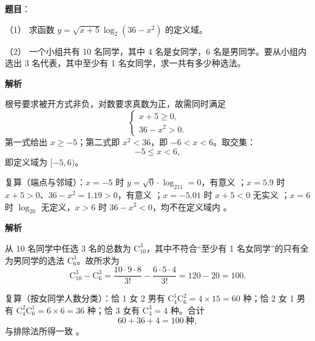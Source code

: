 \begin{answer}

\textbf{题目}：

（1） 求函数 $y=\sqrt{x+5}\log_2(36-x^2)$ 的定义域。

（2） 一个小组共有 10 名同学，其中 4 名是女同学，6 名是男同学。要从小组内选出 3 名代表，其中至少有 1 名女同学，求一共有多少种选法。

\textbf{解析}


根号要求被开方式非负，对数要求真数为正，故需同时满足
\nopagebreak[4]
\[
\begin{cases}
x+5\ge0,\\[2pt]
36-x^2>0.
\end{cases}
\]
第一式给出 $x\ge-5$；第二式即 $x^2<36$，即 $-6<x<6$。取交集：
\nopagebreak[4]
\[
-5\le x<6,
\]
即定义域为 $[-5,6)$。

复算（端点与邻域）：$x=-5$ 时 $y=\sqrt0\cdot\log_211=0$，有意义 ；$x=5.9$ 时 $x+5>0$、$36-x^2=1.19>0$，有意义 ；$x=-5.01$ 时 $x+5<0$ 无实义 ；$x=6$ 时 $\log_20$ 无定义，$x>6$ 时 $36-x^2<0$，均不在定义域内 。


\textbf{解析}

从 10 名同学中任选 3 名的总数为 $\mathrm C_{10}^3$，其中不符合“至少有 1 名女同学”的只有全为男同学的选法 $\mathrm C_6^3$。故所求为
\nopagebreak[4]
\[
\mathrm C_{10}^3-\mathrm C_6^3=\frac{10\cdot9\cdot8}{3!}-\frac{6\cdot5\cdot4}{3!}=120-20=100.
\]

复算（按女同学人数分类）：恰 1 女 2 男有 $\mathrm C_4^1\mathrm C_6^2=4\times15=60$ 种；恰 2 女 1 男有 $\mathrm C_4^2\mathrm C_6^1=6\times6=36$ 种；恰 3 女有 $\mathrm C_4^3=4$ 种。合计
\nopagebreak[4]
\[
60+36+4=100\ \text{种},
\]
与排除法所得一致 。

\gkanswer{答案（1）：$[-5,6)$}


\end{answer}
